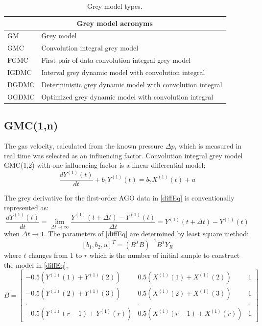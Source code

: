 \documentclass[AMS,STIX2COL]{WileyNJD-v2}
\begin{document}
\begin{center}
	\begin{table}[t]
		\centering
		\caption{Grey model types.} \label{tabGreyGlossary}
		\begin{tabular*}{500pt}{@{\extracolsep\fill}ll@{\extracolsep\fill}}
			\toprule
			\multicolumn{2}{c}{Grey model acronyms} \\
			\midrule
			GM& Grey model\\
			GMC& Convolution integral grey model\\
			FGMC& First-pair-of-data convolution integral grey model \\
			IGDMC& Interval grey dynamic model with convolution integral\\
			DGDMC& Deterministic grey dynamic model with convolution integral\\
			OGDMC& Optimized grey dynamic model with convolution integral\\
			\bottomrule
		\end{tabular*}		
	\end{table}
\end{center}

\subsection{GMC(1,n)}

The gas velocity, calculated from the known pressure $\Delta p$, which is measured in real time was selected as an influencing factor. Convolution integral grey model GMC(1,2) with one influencing factor is a linear differential model:
\begin{equation} 
\frac{dY^{(1)}(t)}{dt}+b_1Y^{(1)}(t)=b_2X^{(1)}(t)+u \label{diffEq}
\end{equation}

The grey derivative for the first-order AGO data in \eqref{diffEq} is conventionally represented as:
\begin{equation} 
\frac{dY^{(1)}(t)}{dt}=\lim\limits_{\Delta t\to \infty}\frac{Y^{(1)}(t+\Delta t)-Y^{(1)}(t)}{\Delta t}
=Y^{(1)}(t+\Delta t)-Y^{(1)}(t)
\end{equation}
when $\Delta t \to 1$. The parameters of \eqref{diffEq} are determined by least square method:
\begin{equation} \label{eq:LSM}
[b_1,b_2,u]^T = (B^TB)^{-1}B^TY_R
\end{equation}
where $t$  changes from $1$ to $r$  which is the number of initial sample to construct the model in \eqref{diffEq},
\begin{equation} \label{eq:Bmatrix}
B = \begin{bmatrix}
-0.5\left(Y^{(1)}(1)+Y^{(1)}(2)\right) & 0.5\left(X^{(1)}(1)+X^{(1)}(2)\right) & 1 \\ 
-0.5\left(Y^{(1)}(2)+Y^{(1)}(3)\right) & 0.5\left(X^{(1)}(2)+X^{(1)}(3)\right) & 1 \\
. & . & .\\
-0.5\left(Y^{(1)}(r-1)+Y^{(1)}(r)\right) & 0.5\left(X^{(1)}(r-1)+X^{(1)}(r)\right) & 1
\end{bmatrix}
\end{equation}
\end{document}
